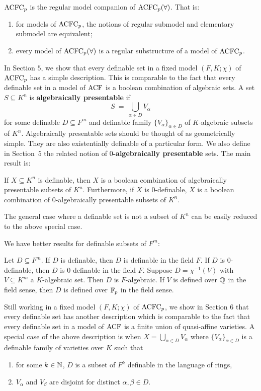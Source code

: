 \begin{thm}
\(\mathrm{ACFC}_p \) is the {\rm regular} model companion of \( \mathrm{ACFC}_p(\forall) \). That is:
\begin{enumerate}
\item for models of $\mathrm{ACFC}_p$, the notions of {\rm regular submodel} and 
{\rm elementary submodel} are equivalent;
\item every model of \( \mathrm{ACFC}_p(\forall) \) is a regular substructure of a model of \( \mathrm{ACFC}_p \).
\end{enumerate}
\end{thm}

\noindent In Section $5$, we show that every definable set in a fixed model $(F, K; \chi)$ of $\mathrm{ACFC}_p$ has a simple description. This is comparable to the fact that every definable set in a model of $\mathrm{ACF}$ is a boolean combination of algebraic sets. A set $S \subseteq K^n$ is {\bf algebraically presentable} if 
$$S\  =\ \bigcup_{\alpha \in D}V_\alpha$$
for some definable $D\subseteq F^m$ and
definable family $\{ V_\alpha\}_{\alpha \in D}$ of $K$-algebraic subsets of $K^n$. 
 Algebraically presentable sets should be thought of as geometrically simple. They are also
existentially definable of a particular form. We also define in Section~$5$ the related notion of {\bf $0$-algebraically presentable} sets. The main result is:

\begin{thm}
If $X \subseteq K^n$ is definable, then $X$ is a boolean combination of algebraically presentable subsets of $K^n$. Furthermore, if $X$ is $0$-definable, $X$ is a boolean combination of 0-algebraically presentable subsets of $K^n$.
\end{thm}

\noindent
The general case where a definable set is not a subset of $K^n$ can be easily reduced to the above special case.

\newpage
\noindent We have better results for definable subsets of $F^m$:

\begin{thm}
Let $D\subseteq F^m$. If $D$ is definable, then $D$ is definable in the field $F$. If $D$ is $0$-definable, then $D$ is $0$-definable in the field $F$. 
Suppose $D = \chi^{-1}(V)$ with  $V\subseteq K^m$ a $K$-algebraic set. Then $D$ is $F$-algebraic. If $V$ is defined over $\mathbb{Q}$ in the field sense, then $D$ is defined over $\mathbb{F}_p$ in the field sense. 
\end{thm}

\noindent
Still working in a fixed model $(F, K; \chi)$ of $\mathrm{ACFC}_p$, we show in Section $6$ that every definable set has another description which is comparable to the fact that every definable set in a model of $\mathrm{ACF}$ is a finite union of quasi-affine varieties. A special case of the above description is when $X = \bigcup_{\alpha \in D} V_\alpha$ where $\{ V_\alpha\}_{\alpha \in D}$ is a definable family of varieties over $K$ such that 
\begin{enumerate}
\item for some $k\in \mathbb{N}$, $D$ is a subset of $F^k$ definable in the language of rings,
\item $V_\alpha$  and $V_\beta$ are disjoint for distinct $ \alpha, \beta \in D $.
\end{enumerate}

